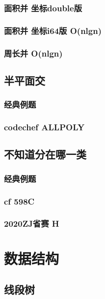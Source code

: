 \documentclass[10pt,a4paper]{article}
\begin{document}
\subsubsection{面积并 坐标double版}

\subsubsection{面积并 坐标i64版 O(nlgn)}

\subsubsection{周长并 O(nlgn)}

\subsection{半平面交}
\subsubsection{经典例题}

\subsubsection{codechef ALLPOLY}

\subsection{不知道分在哪一类}
\subsubsection{经典例题}

\subsubsection{cf 598C}

\subsubsection{2020ZJ省赛 H}

\section{数据结构}
\subsection{线段树}
\end{document}
